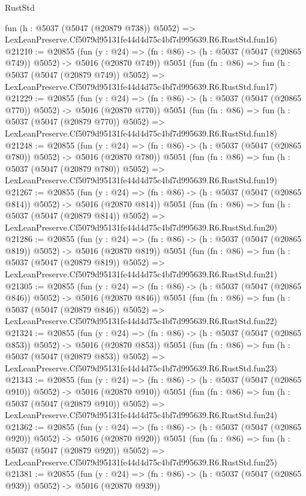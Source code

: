 \begin{lexlean}{RustStd}
\begin{coremodule}
    fun (h : @5037 (@5047 (@20879 @738)) @5052) =>
    LexLeanPreserve.Cf5079d95131fe44d4d75c4bf7d995639.R6.RustStd.fun16)
@21210 := @20855
    (fun (y : @24) => (fn : @86) -> (h : @5037 (@5047 (@20865 @749)) @5052) -> @5016 (@20870 @749))
    @5051
    (fun (fn : @86) =>
    fun (h : @5037 (@5047 (@20879 @749)) @5052) =>
    LexLeanPreserve.Cf5079d95131fe44d4d75c4bf7d995639.R6.RustStd.fun17)
@21229 := @20855
    (fun (y : @24) => (fn : @86) -> (h : @5037 (@5047 (@20865 @770)) @5052) -> @5016 (@20870 @770))
    @5051
    (fun (fn : @86) =>
    fun (h : @5037 (@5047 (@20879 @770)) @5052) =>
    LexLeanPreserve.Cf5079d95131fe44d4d75c4bf7d995639.R6.RustStd.fun18)
@21248 := @20855
    (fun (y : @24) => (fn : @86) -> (h : @5037 (@5047 (@20865 @780)) @5052) -> @5016 (@20870 @780))
    @5051
    (fun (fn : @86) =>
    fun (h : @5037 (@5047 (@20879 @780)) @5052) =>
    LexLeanPreserve.Cf5079d95131fe44d4d75c4bf7d995639.R6.RustStd.fun19)
@21267 := @20855
    (fun (y : @24) => (fn : @86) -> (h : @5037 (@5047 (@20865 @814)) @5052) -> @5016 (@20870 @814))
    @5051
    (fun (fn : @86) =>
    fun (h : @5037 (@5047 (@20879 @814)) @5052) =>
    LexLeanPreserve.Cf5079d95131fe44d4d75c4bf7d995639.R6.RustStd.fun20)
@21286 := @20855
    (fun (y : @24) => (fn : @86) -> (h : @5037 (@5047 (@20865 @819)) @5052) -> @5016 (@20870 @819))
    @5051
    (fun (fn : @86) =>
    fun (h : @5037 (@5047 (@20879 @819)) @5052) =>
    LexLeanPreserve.Cf5079d95131fe44d4d75c4bf7d995639.R6.RustStd.fun21)
@21305 := @20855
    (fun (y : @24) => (fn : @86) -> (h : @5037 (@5047 (@20865 @846)) @5052) -> @5016 (@20870 @846))
    @5051
    (fun (fn : @86) =>
    fun (h : @5037 (@5047 (@20879 @846)) @5052) =>
    LexLeanPreserve.Cf5079d95131fe44d4d75c4bf7d995639.R6.RustStd.fun22)
@21324 := @20855
    (fun (y : @24) => (fn : @86) -> (h : @5037 (@5047 (@20865 @853)) @5052) -> @5016 (@20870 @853))
    @5051
    (fun (fn : @86) =>
    fun (h : @5037 (@5047 (@20879 @853)) @5052) =>
    LexLeanPreserve.Cf5079d95131fe44d4d75c4bf7d995639.R6.RustStd.fun23)
@21343 := @20855
    (fun (y : @24) => (fn : @86) -> (h : @5037 (@5047 (@20865 @910)) @5052) -> @5016 (@20870 @910))
    @5051
    (fun (fn : @86) =>
    fun (h : @5037 (@5047 (@20879 @910)) @5052) =>
    LexLeanPreserve.Cf5079d95131fe44d4d75c4bf7d995639.R6.RustStd.fun24)
@21362 := @20855
    (fun (y : @24) => (fn : @86) -> (h : @5037 (@5047 (@20865 @920)) @5052) -> @5016 (@20870 @920))
    @5051
    (fun (fn : @86) =>
    fun (h : @5037 (@5047 (@20879 @920)) @5052) =>
    LexLeanPreserve.Cf5079d95131fe44d4d75c4bf7d995639.R6.RustStd.fun25)
@21381 := @20855
    (fun (y : @24) => (fn : @86) -> (h : @5037 (@5047 (@20865 @939)) @5052) -> @5016 (@20870 @939))

\end{coremodule}
\end{lexlean}

